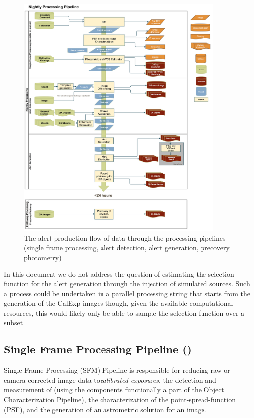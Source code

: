 \begin{figure}[th]
\begin{center}
\includegraphics[width=0.9\textwidth]{figures/Level_1_Processing_Flowchart.jpg}
\caption{\label{fig:nightly} The alert production flow of data through
  the processing pipelines (single frame processing, alert detection,
  alert generation, precovery photometry) }
\end{center}
\end{figure}

In this document we do not address the question of estimating the selection function for the alert generation through the injection of simulated sources. Such a process could be undertaken in a parallel processing string that starts from the generation of the CalExp images though, given the available computational resources, this would likely only be able to sample the selection function over a subset

\subsection{Single Frame Processing Pipeline (\wbsSFM)}
\label{sec:apSingleFrameProcessing}

Single Frame Processing (SFM) Pipeline is responsible for reducing raw or camera corrected image data to\emph{calibrated exposures}, the detection and measurement of \Sources (using the components functionally a part of the Object Characterization Pipeline), the characterization of the point-spread-function (PSF), and the generation of an astrometric solution for an image.

